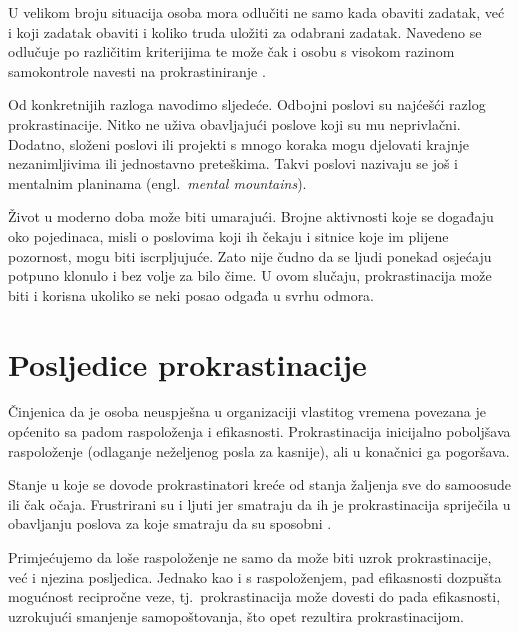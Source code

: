 \documentclass[11pt,twocolumn,english]{article}
\newcommand{\engl}[1]{(engl.~\emph{#1})}
\begin{document}
U velikom broju situacija osoba mora odlučiti ne samo kada obaviti zadatak, već
i koji zadatak obaviti i koliko truda uložiti za odabrani zadatak.
Navedeno se odlučuje po različitim kriterijima te može čak i osobu s visokom
razinom samokontrole navesti na prokrastiniranje \cite{o2001choice}.

Od konkretnijih razloga \cite{PickBrain5reasons, Lifehack6reasons} navodimo
sljedeće. Odbojni poslovi su najćešći razlog prokrastinacije. Nitko ne uživa
obavljajući poslove koji su mu neprivlačni. Dodatno, složeni poslovi ili
projekti s mnogo koraka mogu djelovati krajnje nezanimljivima ili jednostavno
preteškima. Takvi poslovi nazivaju se još i mentalnim planinama \engl{mental
mountains}.

Život u moderno doba može biti umarajući. Brojne aktivnosti koje se
događaju oko pojedinaca, misli o poslovima koji ih čekaju i sitnice koje im
plijene pozornost, mogu biti iscrpljujuće. Zato nije čudno da se ljudi ponekad
osjećaju potpuno klonulo i bez volje za bilo čime. U ovom slučaju,
prokrastinacija može biti i korisna ukoliko se neki posao odgađa u svrhu odmora.


\section{Posljedice prokrastinacije}
Činjenica da je osoba neuspješna u organizaciji vlastitog vremena povezana je
općenito sa padom raspoloženja i efikasnosti. Prokrastinacija inicijalno
poboljšava raspoloženje (odlaganje neželjenog posla za kasnije), ali u
konačnici ga pogoršava.

Stanje u koje se dovode prokrastinatori kreće od
stanja žaljenja sve do samoosude ili čak očaja. Frustrirani su i ljuti jer
smatraju da ih je prokrastinacija spriječila u obavljanju poslova za koje
smatraju da su sposobni \cite{burka2004procrastination}.

Primjećujemo da loše raspoloženje ne samo da može biti uzrok prokrastinacije,
već i njezina posljedica. Jednako kao i s raspoloženjem, pad efikasnosti
dozpušta mogućnost recipročne veze, tj.~prokrastinacija može dovesti do pada
efikasnosti, uzrokujući smanjenje samopoštovanja, što opet rezultira prokrastinacijom.
\end{document}
